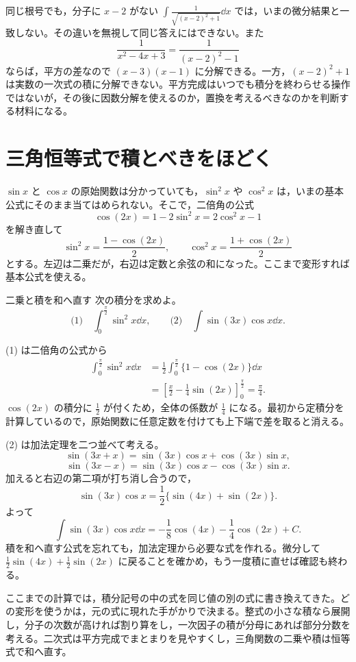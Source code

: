 同じ根号でも，分子に $x-2$ がない $\int\frac1{\sqrt{(x-2)^2+1}}\dd x$ では，いまの微分結果と一致しない。その違いを無視して同じ答えにはできない。また
\[
 \frac1{x^2-4x+3}=\frac1{(x-2)^2-1}
\]
ならば，平方の差なので $(x-3)(x-1)$ に分解できる。一方，$(x-2)^2+1$ は実数の一次式の積に分解できない。平方完成はいつでも積分を終わらせる操作ではないが，その後に因数分解を使えるのか，置換を考えるべきなのかを判断する材料になる。

\section{三角恒等式で積とべきをほどく}\label{節:三角式の整理}

$\sin x$ と $\cos x$ の原始関数は分かっていても，$\sin^2x$ や $\cos^2x$ は，いまの基本公式にそのまま当てはめられない。そこで，二倍角の公式
\[
 \cos(2x)=1-2\sin^2x=2\cos^2x-1
\]
を解き直して
\[
 \sin^2x=\frac{1-\cos(2x)}2,\qquad
 \cos^2x=\frac{1+\cos(2x)}2
\]
とする。左辺は二乗だが，右辺は定数と余弦の和になった。ここまで変形すれば基本公式を使える。

\begin{example}{二乗と積を和へ直す}
次の積分を求めよ。
\[
 \text{(1)}\quad\int_0^{\frac\pi2}\sin^2x\dd x,
 \qquad
 \text{(2)}\quad\int\sin(3x)\cos x\dd x.
\]
\end{example}

(1) は二倍角の公式から
\[
\begin{aligned}
 \int_0^{\frac\pi2}\sin^2x\dd x
 &=\frac12\int_0^{\frac\pi2}\{1-\cos(2x)\}\dd x\\
 &=\left[\frac x2-\frac14\sin(2x)\right]_0^{\frac\pi2}
 =\frac\pi4.
\end{aligned}
\]
$\cos(2x)$ の積分に $\frac12$ が付くため，全体の係数が $\frac14$ になる。最初から定積分を計算しているので，原始関数に任意定数を付けても上下端で差を取ると消える。

(2) は加法定理を二つ並べて考える。
\[
 \sin(3x+x)=\sin(3x)\cos x+\cos(3x)\sin x,
\]
\[
 \sin(3x-x)=\sin(3x)\cos x-\cos(3x)\sin x.
\]
加えると右辺の第二項が打ち消し合うので，
\[
 \sin(3x)\cos x=\frac12\{\sin(4x)+\sin(2x)\}.
\]
よって
\[
 \int\sin(3x)\cos x\dd x
 =-\frac18\cos(4x)-\frac14\cos(2x)+C.
\]
積を和へ直す公式を忘れても，加法定理から必要な式を作れる。微分して $\frac12\sin(4x)+\frac12\sin(2x)$ に戻ることを確かめ，もう一度積に直せば確認も終わる。

ここまでの計算では，積分記号の中の式を同じ値の別の式に書き換えてきた。どの変形を使うかは，元の式に現れた手がかりで決まる。整式の小さな積なら展開し，分子の次数が高ければ割り算をし，一次因子の積が分母にあれば部分分数を考える。二次式は平方完成でまとまりを見やすくし，三角関数の二乗や積は恒等式で和へ直す。

